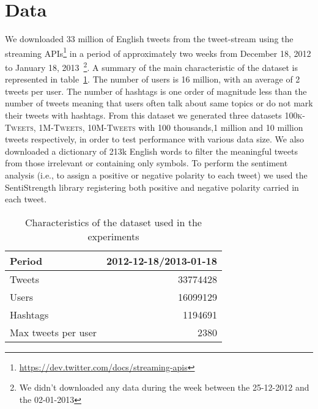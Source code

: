 \section{Data}
\label{sec:data}

We downloaded 33 million of English tweets from the tweet-stream using the streaming APIs\footnote{\url{https://dev.twitter.com/docs/streaming-apis}} in a period of approximately two weeks from December 18, 2012 to January 18, 2013~\footnote{We didn't downloaded any data during the week between the 25-12-2012 and the 02-01-2013}. 
A summary of the main characteristic of the dataset is represented in table~\ref{tbl:dataset}.
The number of users is 16 million, with an average of 2 tweets per user. 
The number of hashtags is one order of magnitude less than the number of tweets meaning that users often talk about same topics or do not mark their tweets with hashtags.
From this dataset we generated three datasets \textsc{100k-Tweets}, \textsc{1M-Tweets}, \textsc{10M-Tweets} with 100 thousands,1 million and 10 million tweets respectively, in order to test performance with various data size. 
We also downloaded a dictionary of 213k English words to filter the meaningful tweets from those irrelevant or containing only symbols. 
To perform the sentiment analysis (i.e., to assign a positive or negative polarity to each tweet) we used the SentiStrength library registering both positive and negative polarity carried in each tweet. 

\begin{table}[htb]
\centering 
\begin{tabular}{|l|r|}
\hline		
Period			& 2012-12-18/2013-01-18\\
\hline
Tweets			&	33774428\\
Users 			&	16099129\\
Hashtags 		&	1194691\\
Max tweets per user & 2380\\  
\hline
\end{tabular}
\caption{Characteristics of the dataset used in the experiments}
\label{tbl:dataset}
\end{table}

